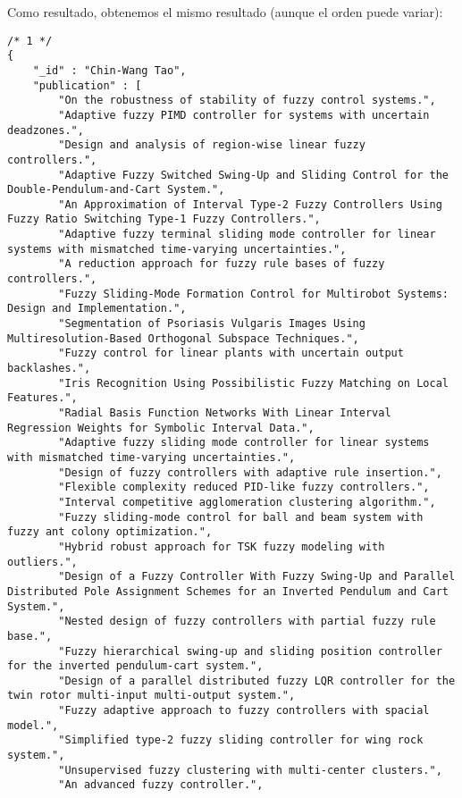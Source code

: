 Como resultado, obtenemos el mismo resultado (aunque el orden puede variar):

\begin{verbatim}
/* 1 */
{
    "_id" : "Chin-Wang Tao",
    "publication" : [ 
        "On the robustness of stability of fuzzy control systems.", 
        "Adaptive fuzzy PIMD controller for systems with uncertain deadzones.", 
        "Design and analysis of region-wise linear fuzzy controllers.", 
        "Adaptive Fuzzy Switched Swing-Up and Sliding Control for the Double-Pendulum-and-Cart System.", 
        "An Approximation of Interval Type-2 Fuzzy Controllers Using Fuzzy Ratio Switching Type-1 Fuzzy Controllers.", 
        "Adaptive fuzzy terminal sliding mode controller for linear systems with mismatched time-varying uncertainties.", 
        "A reduction approach for fuzzy rule bases of fuzzy controllers.", 
        "Fuzzy Sliding-Mode Formation Control for Multirobot Systems: Design and Implementation.", 
        "Segmentation of Psoriasis Vulgaris Images Using Multiresolution-Based Orthogonal Subspace Techniques.", 
        "Fuzzy control for linear plants with uncertain output backlashes.", 
        "Iris Recognition Using Possibilistic Fuzzy Matching on Local Features.", 
        "Radial Basis Function Networks With Linear Interval Regression Weights for Symbolic Interval Data.", 
        "Adaptive fuzzy sliding mode controller for linear systems with mismatched time-varying uncertainties.", 
        "Design of fuzzy controllers with adaptive rule insertion.", 
        "Flexible complexity reduced PID-like fuzzy controllers.", 
        "Interval competitive agglomeration clustering algorithm.", 
        "Fuzzy sliding-mode control for ball and beam system with fuzzy ant colony optimization.", 
        "Hybrid robust approach for TSK fuzzy modeling with outliers.", 
        "Design of a Fuzzy Controller With Fuzzy Swing-Up and Parallel Distributed Pole Assignment Schemes for an Inverted Pendulum and Cart System.", 
        "Nested design of fuzzy controllers with partial fuzzy rule base.", 
        "Fuzzy hierarchical swing-up and sliding position controller for the inverted pendulum-cart system.", 
        "Design of a parallel distributed fuzzy LQR controller for the twin rotor multi-input multi-output system.", 
        "Fuzzy adaptive approach to fuzzy controllers with spacial model.", 
        "Simplified type-2 fuzzy sliding controller for wing rock system.", 
        "Unsupervised fuzzy clustering with multi-center clusters.", 
        "An advanced fuzzy controller.", 

\end{verbatim}
